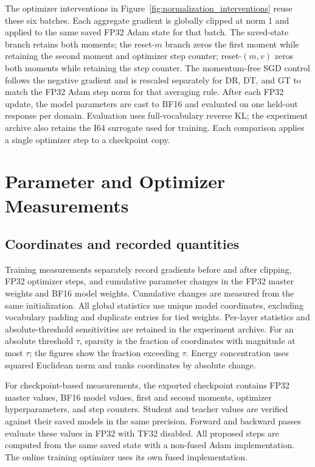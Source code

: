 The optimizer interventions in Figure~\ref{fig:normalization_interventions} reuse these six batches. Each aggregate gradient is globally clipped at norm 1 and applied to the same saved FP32 Adam state for that batch. The saved-state branch retains both moments; the reset-$m$ branch zeros the first moment while retaining the second moment and optimizer step counter; reset-$(m,v)$ zeros both moments while retaining the step counter. The momentum-free SGD control follows the negative gradient and is rescaled separately for DR, DT, and GT to match the FP32 Adam step norm for that averaging rule. After each FP32 update, the model parameters are cast to BF16 and evaluated on one held-out response per domain. Evaluation uses full-vocabulary reverse KL; the experiment archive also retains the I64 surrogate used for training. Each comparison applies a single optimizer step to a checkpoint copy.

\section{Parameter and Optimizer Measurements}
\label{app:records}

\subsection{Coordinates and recorded quantities}

Training measurements separately record gradients before and after clipping, FP32 optimizer steps, and cumulative parameter changes in the FP32 master weights and BF16 model weights. Cumulative changes are measured from the same initialization. All global statistics use unique model coordinates, excluding vocabulary padding and duplicate entries for tied weights. Per-layer statistics and absolute-threshold sensitivities are retained in the experiment archive. For an absolute threshold $\tau$, sparsity is the fraction of coordinates with magnitude at most $\tau$; the figures show the fraction exceeding $\tau$. Energy concentration uses squared Euclidean norm and ranks coordinates by absolute change.

For checkpoint-based measurements, the exported checkpoint contains FP32 master values, BF16 model values, first and second moments, optimizer hyperparameters, and step counters. Student and teacher values are verified against their saved models in the same precision. Forward and backward passes evaluate these values in FP32 with TF32 disabled. All proposed steps are computed from the same saved state with a non-fused Adam implementation. The online training optimizer uses its own fused implementation.

